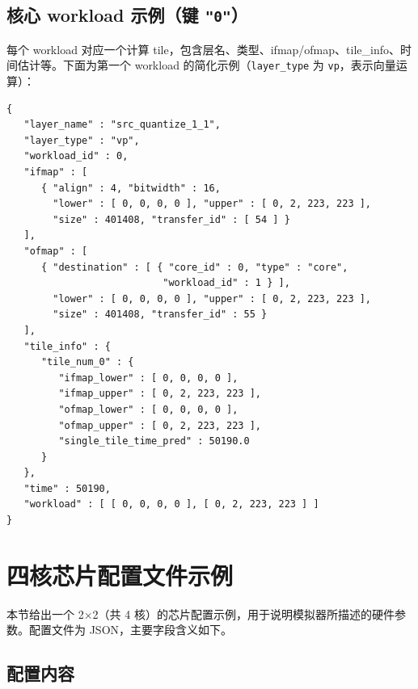\subsection{核心 workload 示例（键 \texttt{"0"}）}

每个 workload 对应一个计算 tile，包含层名、类型、ifmap/ofmap、tile\_info、时间估计等。下面为第一个 workload 的简化示例（\texttt{layer\_type} 为 \texttt{vp}，表示向量运算）：

{\small
\begin{verbatim}
{
   "layer_name" : "src_quantize_1_1",
   "layer_type" : "vp",
   "workload_id" : 0,
   "ifmap" : [
      { "align" : 4, "bitwidth" : 16,
        "lower" : [ 0, 0, 0, 0 ], "upper" : [ 0, 2, 223, 223 ],
        "size" : 401408, "transfer_id" : [ 54 ] }
   ],
   "ofmap" : [
      { "destination" : [ { "core_id" : 0, "type" : "core",
                           "workload_id" : 1 } ],
        "lower" : [ 0, 0, 0, 0 ], "upper" : [ 0, 2, 223, 223 ],
        "size" : 401408, "transfer_id" : 55 }
   ],
   "tile_info" : {
      "tile_num_0" : {
         "ifmap_lower" : [ 0, 0, 0, 0 ],
         "ifmap_upper" : [ 0, 2, 223, 223 ],
         "ofmap_lower" : [ 0, 0, 0, 0 ],
         "ofmap_upper" : [ 0, 2, 223, 223 ],
         "single_tile_time_pred" : 50190.0
      }
   },
   "time" : 50190,
   "workload" : [ [ 0, 0, 0, 0 ], [ 0, 2, 223, 223 ] ]
}
\end{verbatim}
}

\section{四核芯片配置文件示例}

本节给出一个 2×2（共 4 核）的芯片配置示例，用于说明模拟器所描述的硬件参数。配置文件为 JSON，主要字段含义如下。

\subsection{配置内容}

